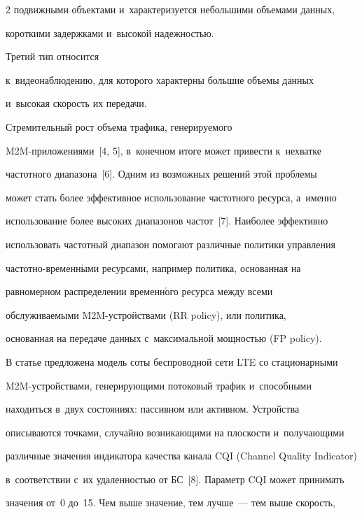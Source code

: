 \begin{multicols}{2}
подвижными объектами и~характеризуется небольшими объемами данных, 


короткими задержками и~высокой надежностью. 





Третий тип относится 


к~видеонаблюдению, для которого характерны большие объемы данных 


и~высокая скорость их передачи. 


  


  Стремительный рост объема трафика, генерируемого  


M2M-при\-ло\-же\-ни\-ями~[4, 5], в~конечном \mbox{итоге} может привести к~нехватке 


частотного диапазона~[6]. Одним из возможных решений этой проб\-ле\-мы 


может стать более эффективное использование частотного ресурса, а~именно 


использование более высоких диапазонов час\-тот~[7]. Наиболее эффективно 


использовать частотный диапазон помогают различные политики управления 


час\-тот\-но-вре\-мен\-н$\acute{\mbox{ы}}$\-ми ресурсами, например политика, основанная на 


равномерном распределении временн$\acute{\mbox{о}}$го ресурса между всеми 


обслуживаемыми M2M-устрой\-ст\-ва\-ми (RR policy), или политика, 


основанная на передаче данных с~максимальной мощностью (FP policy). 


  


  В статье предложена модель соты беспроводной сети LTE со стационарными 


M2M-устрой\-ст\-ва\-ми, генерирующими потоковый трафик и~способными 


находиться в~двух состояниях: пассивном или активном. Устройства 


описываются точками, случайно возникающими на плоскости и~получающими 


различные значения индикатора качества канала CQI (Channel Quality Indicator) 


в~соответствии с~их удаленностью от БС~[8]. Параметр CQI может принимать 


значения от~0 до~15. Чем выше значение, тем лучше~--- тем выше скорость, 



\end{multicols}
